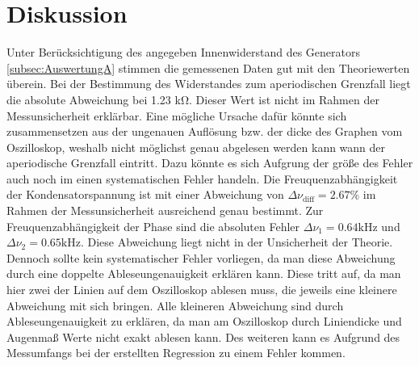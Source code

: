 \section{Diskussion}
\label{sec:Diskussion}
Unter Berücksichtigung des angegeben Innenwiderstand des Generators \autoref{subsec:AuswertungA} stimmen die gemessenen Daten gut mit den Theoriewerten überein. 
Bei der Bestimmung des Widerstandes zum aperiodischen Grenzfall liegt die absolute Abweichung bei 1.23 \unit{\kilo\ohm}. Dieser Wert ist nicht im Rahmen der Messunsicherheit 
erklärbar. Eine mögliche Ursache dafür könnte sich zusammensetzen aus der ungenauen Auflösung bzw. der dicke des Graphen vom Oszilloskop, weshalb nicht möglichst genau abgelesen 
werden kann wann der aperiodische Grenzfall eintritt. Dazu könnte es sich Aufgrung der größe des Fehler auch noch im einen systematischen Fehler handeln. 
Die Freuquenzabhängigkeit der Kondensatorspannung ist mit einer Abweichung von $\Delta \nu_{\text{diff}} = 2.67\%$ im Rahmen der Messunsicherheit ausreichend genau bestimmt.
Zur Freuquenzabhängigkeit der Phase sind die absoluten Fehler $\Delta \nu_1 = 0.64 \unit{\kilo\hertz}$ und $\Delta \nu_2 = 0.65 \unit{\kilo\hertz}$. Diese Abweichung liegt nicht
in der Unsicherheit der Theorie. Dennoch sollte kein systematischer Fehler vorliegen, da man diese Abweichung durch eine doppelte Ableseungenauigkeit erklären kann. Diese tritt 
auf, da man hier zwei der Linien auf dem Oszilloskop ablesen muss, die jeweils eine kleinere Abweichung mit sich bringen.  
Alle kleineren Abweichung sind durch Ableseungenauigkeit zu erklären, da man am Oszilloskop durch Liniendicke und Augenmaß Werte nicht exakt ablesen kann.
Des weiteren kann es Aufgrund des Messumfangs bei der erstellten Regression zu einem Fehler kommen. 